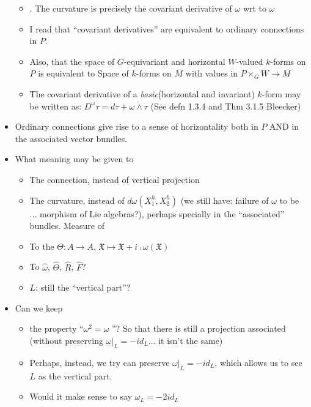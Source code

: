 \begin{itemize}
\begin{itemize}
        \item {}. The curvature is precisely the covariant derivative of $\omega$ wrt to $\omega$
        
        \item I read that ``covariant derivatives'' are equivalent to ordinary connections in $P$.
        
        \item Also, that the space of $G$-equivariant and horizontal $W$-valued $k$-forms on $P$ is equivalent to Space of $k$-forms on $M$ with values in $P\times_G W \to M$
        
        \item The covariant derivative of a \emph{basic}(horizontal and invariant) $k$-form may be written as: $D^\omega \tau = d\tau + \omega \dot{\wedge} \tau$ (See defn 1.3.4 and Thm 3.1.5 Bleecker) 
    \end{itemize}
    
    
    \item Ordinary connections give rise to a sense of horizontality both in $P$ AND in the associated vector bundles.
    
    \item What meaning may be given to
    \begin{itemize}
        \item The connection, instead of vertical projection
        
        \item The curvature, instead of $d\omega(X_1^h, X_2^h)$ (we still have: failure of $\omega$ to be ... morphism of Lie algebras?), perhaps specially in the ``associated'' bundles. Measure of 
        
        \item To the $\Theta:A \to A$, $\mathfrak X \mapsto \mathfrak X + i \comp \omega(\mathfrak X)$ 
        
        \item To $\hat \omega$, $\hat \Theta$, $\hat R$, $\hat F$?
        
        \item $L$: still the ``vertical part''?
    \end{itemize}
    
    \item Can we keep
    \begin{itemize}
        \item the property ``$\omega^2 = \omega$ ''? So that there is still a projection associated (without preserving $\omega |_L = -id_L$... it isn't the same)
        
        \item Perhaps, instead, we try can preserve $\omega |_L = -id_L$, which allows us to see $L$ as the vertical part.
        
        \item Would it make sense to say $\omega_L = -2id_L$
    \end{itemize}
\end{itemize}

